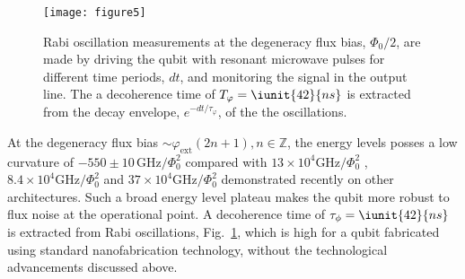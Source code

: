  \begin{figure}[h!]
   \texttt{[image: figure5]}
   \caption{Rabi oscillation measurements at the degeneracy flux bias, $ \Phi_0/2 $, are made by driving the qubit with resonant
     microwave pulses for different time periods, $ dt $, and monitoring the signal in the output line. The a decoherence time of
     $ T_\varphi = \iunit{42}{ns} $ is extracted from the decay envelope, $ e^{-dt/\tau_\varphi} $, of the the oscillations. \label{fig:rabi}}
 \end{figure}

 \noindent At the degeneracy flux bias $ \sim \varphi_{\text{ext}}(2n+1), n \in \mathbb{Z} $, the energy levels posses a low curvature of
 $ -550\pm10\,\text{GHz}/\Phi_0^2 $ compared with $ 13\times 10^4 \text{GHz}/\Phi_0^2$ \cite{stern2014}, $ 8.4 \times 10^4 \text{GHz}/\Phi_0^2$ \cite{zhu2010} and $ 37\times 10^{4} \text{GHz}/\Phi_0^2$ \cite{gustavsson2012} demonstrated recently on other architectures. Such a broad energy level plateau makes the qubit more robust to flux noise at the operational point. A decoherence time of
 $ \tau_\phi = \iunit{42}{ns} $ is extracted from Rabi oscillations, Fig.~\ref{fig:rabi}, which is high for a qubit fabricated using
 standard nanofabrication technology, without the technological advancements discussed above.
